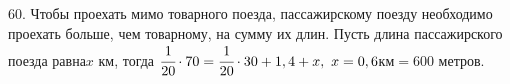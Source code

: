 60. Чтобы проехать мимо товарного поезда, пассажирскому поезду необходимо проехать больше, чем товарному, на сумму их длин. Пусть длина пассажирского поезда равна$x$ км, тогда $\cfrac{1}{20}\cdot70=\cfrac{1}{20}\cdot30+1,4+x,\ x=0,6$км$=600$ метров.\\
